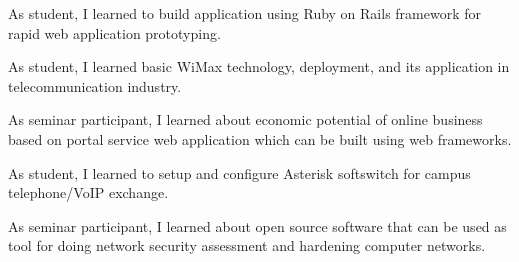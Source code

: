 \documentclass[10pt, a4paper]{moderncv}
\begin{document}
{
    \begin{scriptsize}
    As student, I learned to build application using Ruby on Rails framework for
    rapid web application prototyping.\\
    \end{scriptsize}
}
{
    \begin{scriptsize}
    As student, I learned basic WiMax technology, deployment, and its application in
    telecommunication industry.\\
    \end{scriptsize}
}
{
    \begin{scriptsize}
    As seminar participant, I learned about economic potential of online
    business based on portal service web application which can be built using
    web frameworks.\\
    \end{scriptsize}
}
{
    \begin{scriptsize}
    As student, I learned to setup and configure Asterisk softswitch for campus telephone/VoIP exchange.\\
    \end{scriptsize}
}
{
    \begin{scriptsize}
    As seminar participant, I learned about open source software that can be used
    as tool for doing network security assessment and hardening computer
    networks.\\
    \end{scriptsize}
}
\end{document}
